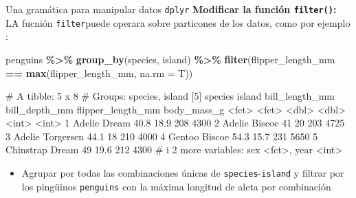 \documentclass[
  ignorenonframetext,
  aspectratio=169]{beamer}
\newenvironment{Shaded}{\begin{snugshade}}{\end{snugshade}}
\newcommand{\AttributeTok}[1]{\textcolor[rgb]{0.13,0.29,0.53}{#1}}
\newcommand{\FunctionTok}[1]{\textcolor[rgb]{0.13,0.29,0.53}{\textbf{#1}}}
\newcommand{\NormalTok}[1]{#1}
\newcommand{\SpecialCharTok}[1]{\textcolor[rgb]{0.81,0.36,0.00}{\textbf{#1}}}
\providecommand{\tightlist}{%
  \setlength{\itemsep}{0pt}\setlength{\parskip}{0pt}}
\let\oldverbatim\verbatim
\let\endoldverbatim\endverbatim
\renewenvironment{verbatim}{\tiny\oldverbatim}{\endoldverbatim}
\begin{document}
\begin{frame}[fragile]{Una gramática para manipular datos
\texttt{dplyr}}
\label{una-gramuxe1tica-para-manipular-datos-dplyr-14}
\textbf{Modificar la función \texttt{filter()}:} LA fucnión
\texttt{filter}puede operara sobre particones de los datos, como por
ejemplo :

\begin{Shaded}
\begin{Highlighting}[]
\NormalTok{penguins }\SpecialCharTok{\%\textgreater{}\%} 
  \FunctionTok{group\_by}\NormalTok{(species, island) }\SpecialCharTok{\%\textgreater{}\%} 
  \FunctionTok{filter}\NormalTok{(flipper\_length\_mm }\SpecialCharTok{==} \FunctionTok{max}\NormalTok{(flipper\_length\_mm, }\AttributeTok{na.rm =}\NormalTok{ T))}
\end{Highlighting}
\end{Shaded}

\begin{verbatim}
# A tibble: 5 x 8
# Groups:   species, island [5]
  species   island    bill_length_mm bill_depth_mm flipper_length_mm body_mass_g
  <fct>     <fct>              <dbl>         <dbl>             <int>       <int>
1 Adelie    Dream               40.8          18.9               208        4300
2 Adelie    Biscoe              41            20                 203        4725
3 Adelie    Torgersen           44.1          18                 210        4000
4 Gentoo    Biscoe              54.3          15.7               231        5650
5 Chinstrap Dream               49            19.6               212        4300
# i 2 more variables: sex <fct>, year <int>
\end{verbatim}

\begin{itemize}
\tightlist
\item
  Agrupar por todas las combinaciones únicas de
  \texttt{species}-\texttt{island} y filtrar por los pingüinos
  \texttt{penguins} con la máxima longitud de aleta por combinación
\end{itemize}
\end{frame}
\end{document}
